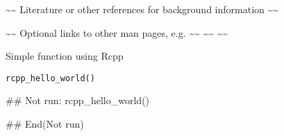 \documentclass[a4paper]{book}
\begin{document}
%
\begin{References}\relax
\textasciitilde{}\textasciitilde{} Literature or other references for background information \textasciitilde{}\textasciitilde{}
\end{References}
%
\begin{SeeAlso}\relax
\textasciitilde{}\textasciitilde{} Optional links to other man pages, e.g. \textasciitilde{}\textasciitilde{}
\textasciitilde{}\textasciitilde{}  \textasciitilde{}\textasciitilde{}
\end{SeeAlso}
%
\begin{Description}\relax
Simple function using Rcpp
\end{Description}
%
\begin{Usage}
\begin{verbatim}
rcpp_hello_world()	
\end{verbatim}
\end{Usage}
%
\begin{Examples}
\begin{ExampleCode}
## Not run: 
rcpp_hello_world()

## End(Not run)
\end{ExampleCode}
\end{Examples}
\printindex{}
\end{document}
